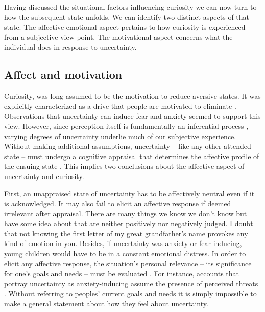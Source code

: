 

Having discussed the situational factors influencing curiosity we can now turn to how the subsequent state unfolds. We can identify two distinct aspects of that state. The affective-emotional aspect pertains to how curiosity is experienced from a subjective view-point. The motivational aspect concerns what the individual does in response to uncertainty.

\subsection{Affect and motivation} 

Curiosity, was long assumed to be the motivation to reduce aversive states. It was explicitly characterized as a drive that people are motivated to eliminate \cite{berlyne_theory_1954,loewenstein_psychology_1994}. Observations that uncertainty can induce fear and anxiety \cite{hebb_organization_2002,carleton_fear_2016} seemed to support this view. However, since perception itself is fundamentally an inferential process \cite{olshausen_perception_2013,friston_active_2016}, varying degrees of uncertainty underlie much of our subjective experience. Without making additional assumptions, uncertainty --  like any other attended state -- must undergo a cognitive appraisal that determines the affective profile of the ensuing state \cite{anderson_relationship_2019}. This implies two conclusions about the affective aspect of uncertainty and curiosity.

First, an unappraised state of uncertainty has to be affectively neutral even if it is acknowledged. It may also fail to elicit an affective response if deemed irrelevant after appraisal. There are many things we know we don't know but have some idea about that are neither positively nor negatively judged. I doubt that not knowing the first letter of my great grandfather's name provokes any kind of emotion in you. Besides, if uncertainty was anxiety or fear-inducing, young children would have to be in a constant emotional distress. In order to elicit any affective response, the situation's personal relevance -- its significance for one's goals and needs -- must be evaluated \cite{lazarus_progress_1991,cunningham_motivational_2012}. For instance, accounts that portray uncertainty as anxiety-inducing assume the presence of perceived threats \cite{grupe_uncertainty_2013}. Without referring to peoples' current goals and needs it is simply impossible to make a general statement about how they feel about uncertainty.

